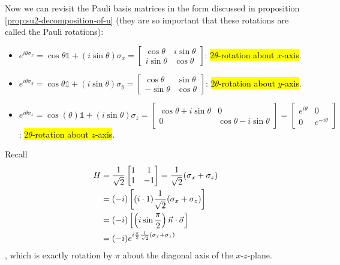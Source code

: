 \documentclass[12pt]{article}
\begin{document}
\begin{example}
Now we can revisit the Pauli basis matrices in the form discussed in proposition \ref{prop:su2-decomposition-of-u} (they are so important that these rotations are called the Pauli rotations):
\begin{itemize}
    \item $e^{i\theta \sigma_x} = \cos\theta\mathbb{1} + (i\sin\theta)  \sigma_x = \begin{bmatrix}
        \cos\theta & i\sin\theta \\
        i\sin\theta & \cos\theta
    \end{bmatrix}$: \hl{$2\theta$-rotation about $x$-axis}.
    \item $e^{i\theta \sigma_y} = \cos\theta\mathbb{1} + (i\sin\theta)\sigma_y = \begin{bmatrix}
        \cos\theta & \sin\theta \\
        -\sin\theta & \cos\theta
    \end{bmatrix}$: \hl{$2\theta$-rotation about $y$-axis}.
    \item $e^{i\theta \sigma_z} = \cos(\theta)\mathbb{1} + (i\sin\theta)\sigma_z = \begin{bmatrix}
        \cos\theta + i\sin\theta & 0 \\
        0 & \cos\theta - i\sin\theta
    \end{bmatrix} = \begin{bmatrix}
        e^{i\theta} & 0 \\
        0 & e^{-i\theta}
    \end{bmatrix}$: \hl{$2\theta$-rotation about $z$-axis}.
\end{itemize}
\end{example}

\begin{example}
Recall $$
\begin{aligned}
H 
    &= \frac{1}{\sqrt{2}}\begin{bmatrix}
    1 & 1\\
    1 & -1
    \end{bmatrix} = \frac{1}{\sqrt{2}} (\sigma_x + \sigma_z)\\
    &= (-i)\left[(i\cdot 1)\frac{1}{\sqrt{2}} (\sigma_x + \sigma_z)\right]\\
    &= (-i)\left[ \left(i\sin\frac{\pi}{2}\right)\vec{n}\cdot \vec{\sigma} \right]\\
    &= (-i) e^{i\frac{\pi}{2}\frac{1}{\sqrt{2}}(\sigma_x + \sigma_z)}
\end{aligned}
$$, which is exactly rotation by $\pi$ about the diagonal axis of the $x$-$z$-plane.
\end{example}
\end{document}
